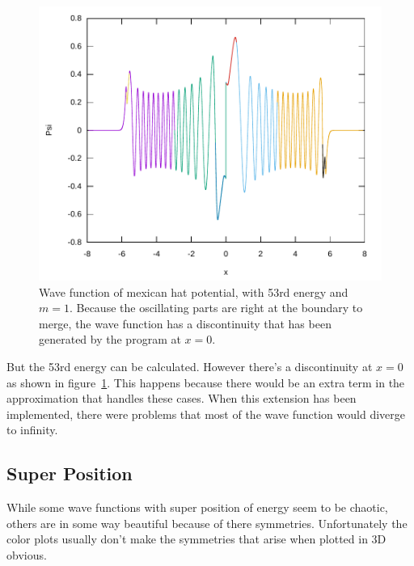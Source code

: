 \documentclass[11pt,DIV=10,final]{scrreprt} %
\begin{document}
{\begin{minipage}{\textwidth}
\begin{figure}[H]
  \centering
  \includegraphics[width=\textwidth]{plots/mexican-hat-53.pdf}
  \caption{
    Wave function of mexican hat potential, with 53rd energy and $m = 1$. Because the oscillating parts are right at the boundary to merge, the wave function has a discontinuity that has been generated by the program at $x = 0$.
  }\label{fig:mexican-hat-53rd-energy}
\end{figure}
But the 53rd energy can be calculated. However there's a discontinuity at $x = 0$ as shown in figure~\ref{fig:mexican-hat-53rd-energy}. This happens because there would be an extra term in the
approximation that handles these cases. When this extension has been implemented, there were problems that most of the wave function would diverge to infinity.
\end{minipage}

\subsection{Super Position}
While some wave functions with super position of energy seem to be chaotic, others are in some way beautiful because of there symmetries.
Unfortunately the color plots usually don't make the symmetries that arise when plotted in 3D obvious.

}
\end{document}

